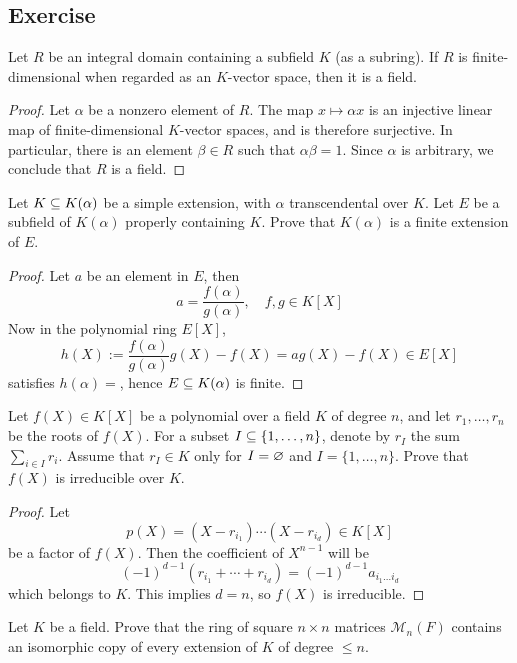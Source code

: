 \subsection{Exercise}
\begin{exercise}\label{integral domain finite dimensional vector space is field}
Let $R$ be an integral domain containing a subfield $K$ (as a subring). If $R$ is finite-dimensional when regarded as an $K$-vector space, then it is a field.
\end{exercise}
\begin{proof}
Let $\alpha$ be a nonzero element of $R$. The map $x\mapsto\alpha x$ is an injective linear map of finite-dimensional $K$-vector spaces, and is therefore surjective. In particular, there is an element $\beta\in R$ such that $\alpha\beta=1$. Since $\alpha$ is arbitrary, we conclude that $R$ is a field.
\end{proof}
\begin{exercise}
Let $K\subseteq K(\alpha)$ be a simple extension, with $\alpha$ transcendental over $K$. Let $E$ be a subfield of $K(\alpha)$ properly containing $K$. Prove that $K(\alpha)$ is a finite extension of $E$.
\end{exercise}
\begin{proof}
Let $a$ be an element in $E$, then 
\[a=\dfrac{f(\alpha)}{g(\alpha)},\quad f,g\in K[X]\]
Now in the polynomial ring $E[X]$,
\[h(X):=\dfrac{f(\alpha)}{g(\alpha)}g(X)-f(X)=ag(X)-f(X)\in E[X]\]
satisfies $h(\alpha)=$, hence $E\subseteq K(\alpha)$ is finite.
\end{proof}
\begin{exercise}\label{irr exercise}
Let $f(X)\in K[X]$ be a polynomial over a field $K$ of degree $n$, and let $r_1,\dots,r_n$ be the roots of $f(X)$. For a subset $I\subseteq\{1,\dots,n\}$, denote by $r_I$ the sum $\sum_{i\in I}r_i$. Assume that $r_I\in K$ only for $I=\varnothing$ and $I=\{1,\dots,n\}$. Prove that $f(X)$ is irreducible over $K$.
\end{exercise}
\begin{proof}
Let 
\[p(X)=(X-r_{i_1})\cdots(X-r_{i_d})\in K[X]\]
be a factor of $f(X)$. Then the coefficient of $X^{n-1}$ will be
\[(-1)^{d-1}(r_{i_1}+\cdots+r_{i_d})=(-1)^{d-1}a_{i_1\dots i_d}\]
which belongs to $K$. This implies $d=n$, so $f(X)$ is irreducible.
\end{proof}
\begin{exercise}
Let $K$ be a field. Prove that the ring of square $n\times n$ matrices $\mathcal{M}_n(F)$ contains an isomorphic copy of every extension of $K$ of degree $\leq n$.
\end{exercise}
